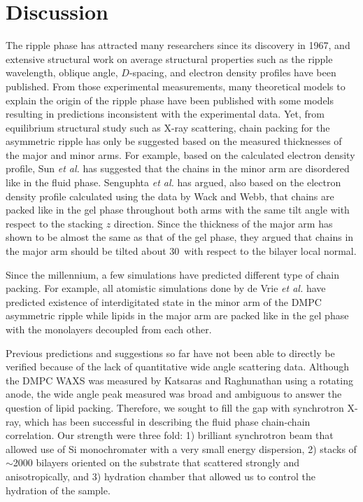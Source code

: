 \newpage
\section{Discussion}\label{sec:ripple_discussion}
The ripple phase has attracted many researchers since its discovery in 1967,
and extensive structural work on average structural properties such as 
the ripple wavelength, oblique angle, $D$-spacing, and electron density
profiles have been published. From those experimental measurements, 
many theoretical models to explain the origin of the ripple phase have 
been published with some models resulting in predictions
inconsistent with the experimental data. Yet, from equilibrium structural
study such as X-ray scattering, chain packing for the asymmetric
ripple has only be suggested based on the measured thicknesses
of the major and minor arms. For example, based on the calculated electron
density profile, Sun \textit{et al.} \cite{ref:Sun96} 
has suggested that the chains in the minor arm are disordered like in the fluid phase.
Senguphta \textit{et al.} \cite{ref:Sengupta03} has argued, 
also based on the electron density profile calculated
using the data by Wack and Webb, that chains are packed like in the gel phase 
throughout both arms with the same tilt angle with respect to the stacking
$z$ direction. Since the thickness of the major arm has
shown to be almost the same as that of the gel phase, they argued that
chains in the major arm should be tilted about 30\textdegree\ with respect
to the bilayer local normal.

Since the millennium, a few simulations
have predicted different type of chain packing. For example, all atomistic simulations
done by de Vrie \textit{et al.} \cite{ref:deVries05} have predicted existence 
of interdigitated state in the minor arm of the DMPC asymmetric ripple 
while lipids in the major arm are packed like in the gel phase with
the monolayers decoupled from each other.  

Previous predictions and suggestions so far have not been able to 
directly be verified because of the lack of quantitative wide angle 
scattering data. Although the DMPC WAXS was measured by Katsaras
and Raghunathan \cite{ref:Katsaras95} using a rotating anode,
the wide angle peak measured was broad and ambiguous to answer
the question of lipid packing. Therefore, we sought to fill the gap
with synchrotron X-ray, which has been successful in describing the fluid
phase chain-chain correlation. Our strength were three fold: 1) brilliant
synchrotron beam that allowed use of Si monochromater with a very small
energy dispersion, 2) stacks of $\sim$2000 bilayers oriented on the substrate
that scattered strongly and anisotropically, and 3) hydration chamber that 
allowed us to control the hydration of the sample.

